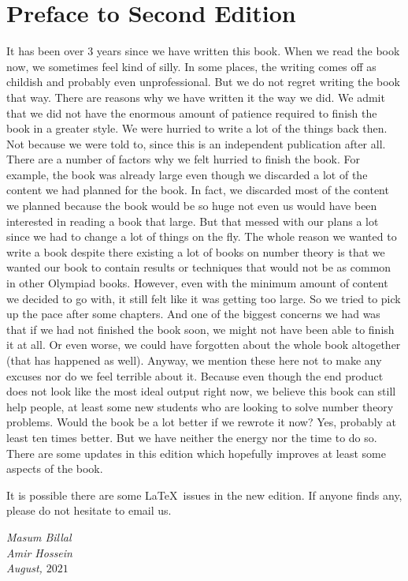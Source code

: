 \documentclass[12pt,leqno]{book}
\begin{document}
\section*{Preface to Second Edition}
It has been over $3$ years since we have written this book. When we read the book now, we sometimes feel kind of silly. In some places, the writing comes off as childish and probably even unprofessional. But we do not regret writing the book that way. There are reasons why we have written it the way we did. We admit that we did not have the enormous amount of patience required to finish the book in a greater style. We were hurried to write a lot of the things back then. Not because we were told to, since this is an independent publication after all. There are a number of factors why we felt hurried to finish the book. For example, the book was already large even though we discarded a lot of the content we had planned for the book. In fact, we discarded most of the content we planned because the book would be so huge not even us would have been interested in reading a book that large. But that messed with our plans a lot since we had to change a lot of things on the fly. The whole reason we wanted to write a book despite there existing a lot of books on number theory is that we wanted our book to contain results or techniques that would not be as common in other Olympiad books. However, even with the minimum amount of content we decided to go with, it still felt like it was getting too large. So we tried to pick up the pace after some chapters. And one of the biggest concerns we had was that if we had not finished the book soon, we might not have been able to finish it at all. Or even worse, we could have forgotten about the whole book altogether (that has happened as well). Anyway, we mention these here not to make any excuses nor do we feel terrible about it. Because even though the end product does not look like the most ideal output right now, we believe this book can still help people, at least some new students who are looking to solve number theory problems. Would the book be a lot better if we rewrote it now? Yes, probably at least ten times better. But we have neither the energy nor the time to do so. There are some updates in this edition which hopefully improves at least some aspects of the book.

It is possible there are some \LaTeX\ issues in the new edition. If anyone finds any, please do not hesitate to email us.

\begin{flushright}
	\it Masum Billal\\
	Amir Hossein\\
	August, $2021$
\end{flushright}
\end{document}
